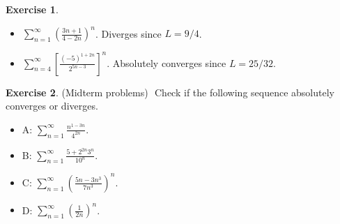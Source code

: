 \documentclass[12pt, psamsfonts]{amsart}
\theoremstyle{definition}
\newtheorem*{exer}{Exercise}
\theoremstyle{remark}
\numberwithin{equation}{section}
\begin{document}
\begin{exer}
$ $
  \begin{itemize}
    \item
      $\sum_{n=1}^{\infty} (\frac{3n + 1}{4 - 2n})^n$.
      Diverges since $L = 9/4$.
    \item
      $\sum_{n=4}^{\infty} [\frac{(-5)^{1 + 2n}}{2^{5n - 3}}]^n$.
      Absolutely converges since $L = 25/32$.
  \end{itemize}
\end{exer}

\begin{exer}{(Midterm problems)}
$ $
  Check if the following sequence absolutely converges or diverges.
  \begin{itemize}
    \item A: $\sum_{n=1}^{\infty} \frac{n^{1-3n}}{4^{2n}}$.
    \item B: $\sum_{n=1}^{\infty} \frac{5 + 2^{2n}3^n}{10^n}$.
    \item C: $\sum_{n=1}^{\infty} (\frac{5n - 3n^3}{7n^3})^n$.
    \item D: $\sum_{n=1}^{\infty} (\frac{1}{2n})^n$.
  \end{itemize}
\end{exer}
\end{document}

